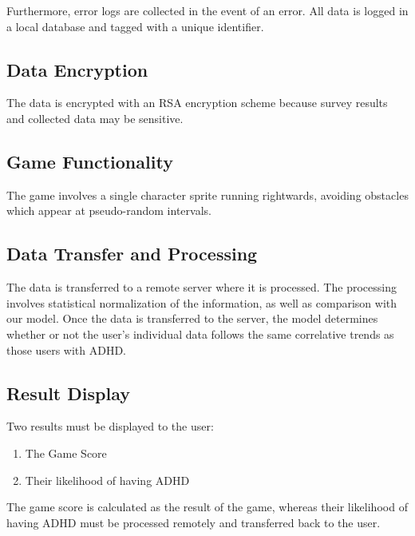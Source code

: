 \documentclass[a4wide]{article}
\begin{document}
Furthermore, error logs are collected in the event of an error. All data is
logged in a local database and tagged with a unique identifier.

\subsection{Data Encryption}
The data is encrypted with an RSA encryption scheme because survey results and
collected data may be sensitive.

\subsection{Game Functionality}
The game involves a single character sprite running rightwards, avoiding
obstacles which appear at pseudo-random intervals.

\subsection{Data Transfer and Processing}
The data is transferred to a remote server where it is processed. The processing
involves statistical normalization of the information, as well as comparison
with our model. Once the data is transferred to the server, the model determines
whether or not the user's individual data follows the same correlative trends as
those users with ADHD.

\subsection{Result Display}
Two results must be displayed to the user:
\begin{enumerate}
\item The Game Score
\item Their likelihood of having ADHD
\end{enumerate}
The game score is calculated as the result of the game, whereas their likelihood
of having ADHD must be processed remotely and transferred back to the user.
\end{document}
